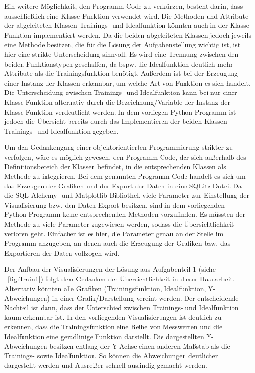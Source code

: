 \documentclass[
    a4paper, 								%
    oneside, 								%
    11pt, 									%
    listof=totoc, 					%
    bibliography=totoc, 		%
    final, 									%
    numbers=noenddot
]{scrreprt}
\newcommand{\abbildung}[1]{\figurename\ \ref{#1}}
\begin{document}
Ein weitere Möglichkeit, den Programm-Code zu verkürzen, besteht darin, dass ausschließlich eine Klasse Funktion verwendet wird. Die Methoden und Attribute der abgeleiteten Klassen Trainings- und Idealfunktion könnten auch in der Klasse Funktion implementiert werden. Da die beiden abgeleiteten Klassen jedoch jeweils eine Methode besitzen, die für die Lösung der Aufgabenstellung wichtig ist, ist hier eine strikte Unterscheidung sinnvoll. Es wird eine Trennung zwischen den beiden Funktionstypen geschaffen, da bspw. die Idealfunktion deutlich mehr Attribute als die Trainingsfunktion benötigt. Außerdem ist bei der Erzeugung einer Instanz der Klassen erkennbar, um welche Art von Funktion es sich handelt. Die Unterscheidung zwischen Trainings- und Idealfunktion kann bei nur einer Klasse Funktion alternativ durch die Bezeichnung/Variable der Instanz der Klasse Funktion verdeutlicht werden. In dem vorliegen Python-Programm ist jedoch die Übersicht bereits durch das Implementieren der beiden Klassen Trainings- und Idealfunktion gegeben. 

Um den Gedankengang einer objektorientierten Programmierung strikter zu verfolgen, wäre es möglich gewesen, den Programm-Code, der sich außerhalb des Definitionsbereich der Klassen befindet, in die entsprechenden Klassen als Methode zu integrieren. Bei dem genannten Programm-Code handelt es sich um das Erzeugen der Grafiken und der Export der Daten in eine SQLite-Datei. Da die SQL-Alchemy- und Matplotlib-Bibliothek viele Parameter zur Einstellung der Visualisierung bzw. den Daten-Export besitzen, sind in dem vorliegenden Python-Programm keine entsprechenden Methoden vorzufinden. Es müssten der Methode zu viele Parameter zugewiesen werden, sodass die Übersichtlichkeit verloren geht. Einfacher ist es hier, die Parameter genau an der Stelle im Programm anzugeben, an denen auch die Erzeugung der Grafiken bzw. das Exportieren der Daten vollzogen wird. 

Der Aufbau der Visualisierungen der Lösung aus Aufgabenteil 1 (siehe \abbildung{fig:Train1}) folgt dem Gedanken der Übersichtlichkeit in dieser Hausarbeit. Alternativ könnten alle Grafiken (Trainingsfunktion, Idealfunktion, Y-Abweichungen) in einer Grafik/Darstellung vereint werden. Der entscheidende Nachteil ist dann, dass der Unterschied zwischen Trainings- und Idealfunktion kaum erkennbar ist. In den vorliegenden Visualisierungen ist deutlich zu erkennen, dass die Trainingsfunktion eine Reihe von Messwerten und die Idealfunktion eine geradlinige Funktion darstellt. Die dargestellten Y-Abweichungen besitzen entlang der Y-Achse einen anderen Maßstab als die Trainings- sowie Idealfunktion. So können die Abweichungen deutlicher dargestellt werden und Ausreißer schnell ausfindig gemacht werden. 
\end{document}
